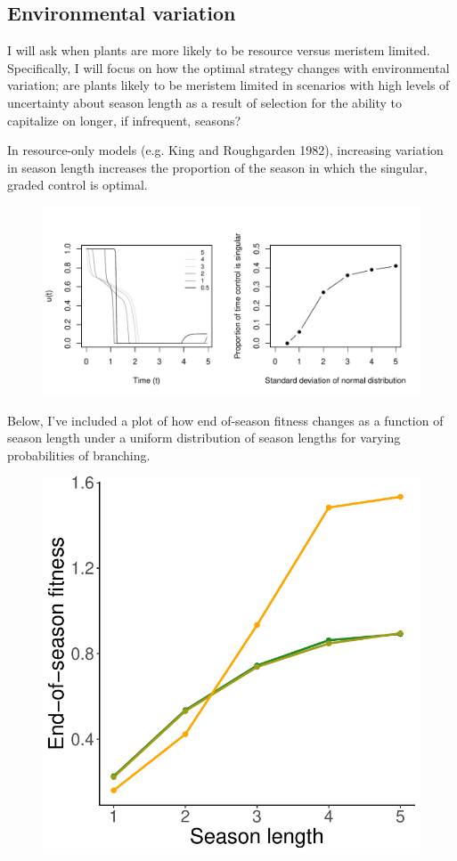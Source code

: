 \documentclass[12pt, oneside]{article}   	%
\begin{document}
\subsection{Environmental variation}

I will ask when plants are more likely to be resource versus meristem limited. Specifically, I will focus on how the optimal strategy changes with environmental variation; are plants likely to be meristem limited in scenarios with high levels of uncertainty about season length as a result of selection for the ability to capitalize on longer, if infrequent, seasons?

In resource-only models (e.g. King and Roughgarden 1982), increasing variation in season length increases the proportion of the season in which the singular, graded control is optimal.

 \begin{figure}[!h]
       \includegraphics[page=1,width=.75\textwidth]{../figures/kingRoughgardenNormalSummary.pdf}  
\end{figure}

Below, I've included a plot of how end of-season fitness changes as a function of season length under a uniform distribution of season lengths for varying probabilities of branching. 

 \begin{figure}[!h]
       \includegraphics[page=1,width=.3\textwidth]{../figures/season.pdf}  
\end{figure}


\clearpage
 

\end{document}
